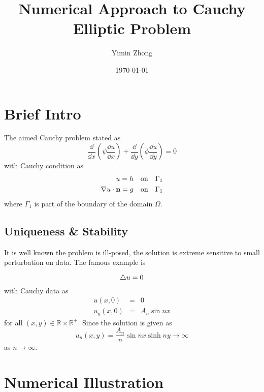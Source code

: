 \documentclass{note}
\author{Yimin Zhong}
\title{Numerical Approach to Cauchy Elliptic Problem}
\date{\today}
\begin{document}
\maketitle
\section{Brief Intro}
The aimed Cauchy problem stated as
\begin{equation}
\frac{\dd}{\dd x}\left(\psi \frac{\dd u}{\dd x}\right) + \frac{\dd}{\dd y}\left(\phi \frac{\dd u}{\dd y}\right) = 0
\end{equation}
with Cauchy condition as
\begin{eqnarray}
u  = h \quad\mbox{on}\quad \Gamma_1 \\
\nabla u \cdot \mathbf{n} = g \quad\mbox{on}\quad \Gamma_1
\end{eqnarray}
where $\Gamma_1$ is part of the boundary of the domain $\Omega$.
\subsection{Uniqueness \& Stability}
It is well known the problem is ill-posed, the solution is extreme sensitive to small perturbation on data. The famous example is
\begin{example}
\begin{equation}
\triangle u = 0
\end{equation}
with Cauchy data as
\begin{eqnarray}
u(x,0) &=& 0 \\
u_y(x,0) &=& A_n\sin nx 
\end{eqnarray}
for all $(x,y)\in \mathbb{R}\times\mathbb{R^{+}}$. Since the solution is given as
\begin{equation}
u_n(x,y) = \frac{A_n}{n}\sin nx \sinh ny \to\infty 
\end{equation}
as $n\to \infty$.
\end{example}
\section{Numerical Illustration}
\end{document}
